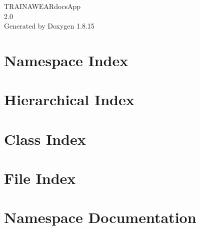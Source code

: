 \let\mypdfximage\pdfximage\def\pdfximage{\immediate\mypdfximage}\documentclass[twoside]{book}
\newcommand{\+}{\discretionary{\mbox{\scriptsize$\hookleftarrow$}}{}{}}
\newcommand{\clearemptydoublepage}{%
  \newpage{\pagestyle{empty}\cleardoublepage}%
}
\begin{document}
\hypersetup{pageanchor=false,
             bookmarksnumbered=true,
             pdfencoding=unicode
            }
\begin{titlepage}
\vspace*{7cm}
\begin{center}%
{\Large T\+R\+A\+I\+N\+A\+W\+E\+A\+Rdocs\+App \\[1ex]\large 2.\+0 }\\
\vspace*{1cm}
{\large Generated by Doxygen 1.8.15}\\
\end{center}
\end{titlepage}
\clearemptydoublepage
{}
\tableofcontents
\clearemptydoublepage
{}
\hypersetup{pageanchor=true}

\chapter{Namespace Index}

\chapter{Hierarchical Index}

\chapter{Class Index}

\chapter{File Index}

\chapter{Namespace Documentation}



\end{document}

